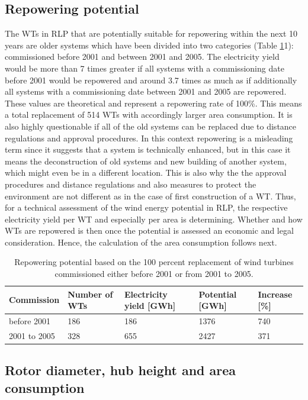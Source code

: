 \documentclass[a4paper,11pt]{article}
\begin{document}
\hypertarget{repowering-potential}{%
\subsection{Repowering potential}\label{repowering-potential}}

The WTs in RLP that are potentially suitable for repowering within the next 10 years are older systems which have been divided into two categories (Table \ref{tab:table1}1): commissioned before 2001 and between 2001 and 2005. The electricity yield would be more than 7 times greater if all systems with a commissioning date before 2001 would be repowered and around 3.7 times as much as if additionally all systems with a commissioning date between 2001 and 2005 are repowered. These values are theoretical and represent a repowering rate of 100\%. This means a total replacement of 514 WTs with accordingly larger area consumption. It is also highly questionable if all of the old systems can be replaced due to distance regulations and approval procedures. In this context repowering is a misleading term since it suggests that a system is technically enhanced, but in this case it means the deconstruction of old systems and new building of another system, which might even be in a different location. This is also why the the approval procedures and distance regulations and also measures to protect the environment are not different as in the case of first construction of a WT. Thus, for a technical assessment of the wind energy potential in RLP, the respective electricity yield per WT and especially per area is determining. Whether and how WTs are repowered is then once the potential is assessed an economic and legal consideration. Hence, the calculation of the area consumption follows next.
\begin{table}[H]

\caption{\label{tab:table1}Repowering potential based on the 100 percent replacement of wind turbines commissioned either 
  before 2001 or from 2001 to 2005.}
\centering
\begin{tabular}[t]{lllll}
\toprule
Commission & Number of WTs & Electricity yield [GWh] & Potential [GWh] & Increase [\%]\\
\midrule
before 2001 & 186 & 186 & 1376 & 740\\
2001 to 2005 & 328 & 655 & 2427 & 371\\
\midrule
\bottomrule
\end{tabular}
\end{table}
\hypertarget{rotor-diameter-hub-height-and-area-consumption}{%
\subsection{Rotor diameter, hub height and area consumption}\label{rotor-diameter-hub-height-and-area-consumption}}
\end{document}
